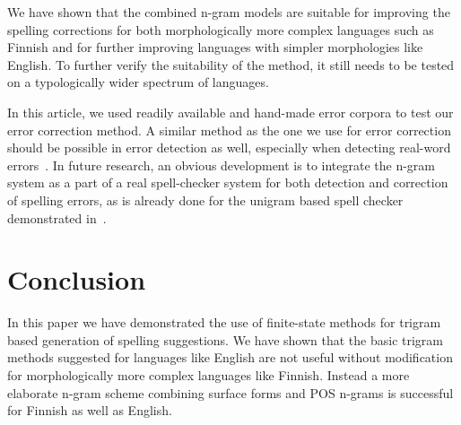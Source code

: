 \documentclass{llncs}
\begin{document}
We have shown that the combined n-gram models are suitable for improving the
spelling corrections for both morphologically more complex languages such as
Finnish and for further improving languages with simpler morphologies like English. To
further verify the suitability of the method, it still needs to be tested on
a typologically wider spectrum of languages.

In this article, we used readily available and hand-made error corpora to test
our error correction method. A similar method as the one we use for error correction 
should be possible in error detection as well, especially when detecting real-word
errors~\cite{mays/1991}. In future research, an obvious development is to
integrate the n-gram system as a part of a real spell-checker system for both
detection and correction of spelling errors, as is already done for the
unigram based spell checker demonstrated in~\cite{pirinen/2010/lrec}.

\section{Conclusion}

In this paper we have demonstrated the use of finite-state methods for trigram based
generation of spelling suggestions. We have shown that the basic trigram
methods suggested for languages like English are not
useful without modification for morphologically more complex languages like
Finnish.  Instead a more elaborate n-gram scheme combining surface forms and 
POS n-grams is successful for Finnish as well as English.





\end{document}
